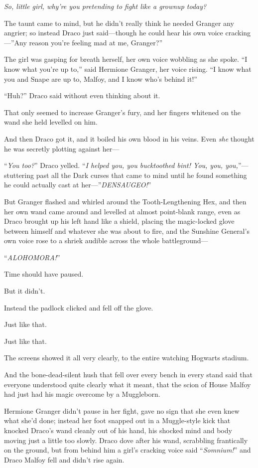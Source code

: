 \emph{So, little girl, why’re you pretending to fight like a grownup today?}

The taunt came to mind, but he didn’t really think he needed Granger any
angrier; so instead Draco just said—though he could hear his own voice
cracking—”Any reason you’re feeling mad at me, Granger?”

The girl was gasping for breath herself, her own voice wobbling as she spoke.
“I know what you’re up to,” said Hermione Granger, her voice rising. “I know
what you and Snape are up to, Malfoy, and I know who’s behind it!”

“Huh?” Draco said without even thinking about it.

That only seemed to increase Granger’s fury, and her fingers whitened on the
wand she held levelled on him.

And then Draco got it, and it boiled his own blood in his veins. Even
\emph{she} thought he was secretly plotting against her—

“\emph{You too?}” Draco yelled. “\emph{I helped you, you bucktoothed bint! You,
you, you,}”— stuttering past all the Dark curses that came to mind until he
found something he could actually cast at her—”\emph{DENSAUGEO!}”

But Granger flashed and whirled around the Tooth-Lengthening Hex, and then her
own wand came around and levelled at almost point-blank range, even as Draco
brought up his left hand like a shield, placing the magic-locked glove between
himself and whatever she was about to fire, and the Sunshine General’s own
voice rose to a shriek audible across the whole battleground—

“\emph{ALOHOMORA!}”

Time should have paused.

But it didn’t.

Instead the padlock clicked and fell off the glove.

Just like that.

Just like that.

The screens showed it all very clearly, to the entire watching Hogwarts stadium.

And the bone-dead-silent hush that fell over every bench in every stand said
that everyone understood quite clearly what it meant, that the scion of House
Malfoy had just had his magic overcome by a Muggleborn.

Hermione Granger didn’t pause in her fight, gave no sign that she even knew
what she’d done; instead her foot snapped out in a Muggle-style kick that
knocked Draco’s wand cleanly out of his hand, his shocked mind and body moving
just a little too slowly. Draco dove after his wand, scrabbling frantically on
the ground, but from behind him a girl’s cracking voice said “\emph{Somnium!}”
and Draco Malfoy fell and didn’t rise again.

